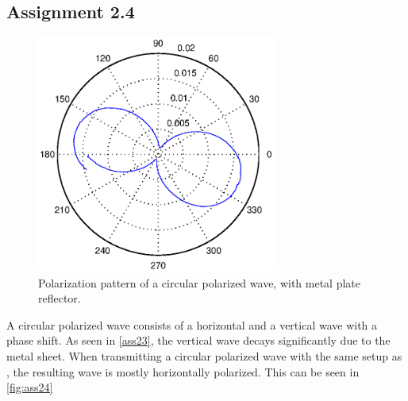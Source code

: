 \documentclass{article}
\begin{document}
\subsection{Assignment 2.4}
\begin{figure}[H]
\centering
\includegraphics[width=0.7\textwidth]{Plotjes/ass24.eps}
\caption{Polarization pattern of a circular polarized wave, with metal plate reflector. }\label{fig:ass24}
\end{figure}
A circular polarized wave consists of a horizontal and a vertical wave with a phase shift. As seen in \autoref{ass23}, the vertical wave decays significantly due to the metal sheet. When transmitting a circular polarized wave with the same setup as , the resulting wave is mostly horizontally polarized. This can be seen in \autoref{fig:ass24}
\end{document}
